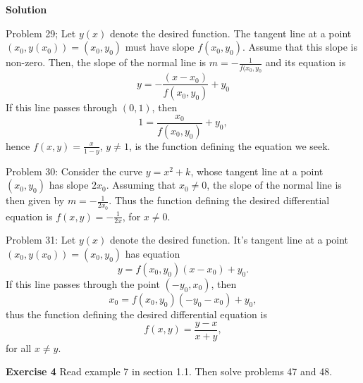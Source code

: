 \documentclass[12pt,oneside]{exam}
\newenvironment{exercise}[1]{\vspace{.1in}\noindent\textbf{Exercise #1 \hspace{.05em}}}{}
\newenvironment{newsolution}{\vspace{.1in}\noindent\textbf{Solution \hspace{.05em}}}{}
\begin{document}
\begin{newsolution}

Problem 29; Let $y(x)$ denote the desired function. The tangent line at a point $(x_0,y(x_0))=(x_0,y_0)$ must have slope $f(x_0,y_0)$. Assume that this slope is non-zero. Then, the slope of the normal line is $m=-\frac{1}{f(x_0,y_0}$ and its equation is 
\begin{equation*}
y=-\frac{(x-x_0)}{f(x_0,y_0)} + y_0
\end{equation*}
If this line passes through $(0,1)$, then 
\begin{equation*}
1=\frac{x_0}{f(x_0,y_0)} + y_0, 
\end{equation*}
hence $f(x,y)=\frac{x}{1-y}$, $y\neq 1$, is the function defining the equation we seek. 

Problem 30: Consider the curve $y=x^2+k$, whose tangent line at a point $(x_0,y_0)$ has slope $2x_0$. Assuming that $x_0 \neq 0$, the slope of the normal line is then given by $m=-\frac{1}{2x_0}$. Thus the function defining the desired differential equation is $f(x,y)=-\frac{1}{2x}$, for $x \neq 0$. 

Problem 31: Let $y(x)$ denote the desired function. It's tangent line at a point $(x_0,y(x_0))=(x_0,y_0)$ has equation
\begin{equation*}
y=f(x_0,y_0)(x-x_0) + y_0.
\end{equation*}
If this line passes through the point $(-y_0,x_0)$, then 
\begin{equation*}
x_0 = f(x_0,y_0)(-y_0-x_0)+y_0, 
\end{equation*}
thus the function defining the desired differential equation is 
\begin{equation*}
f(x,y)=\frac{y-x}{x+y},
\end{equation*}
for all $x \neq y$. 

\end{newsolution}

\begin{exercise}{4}
Read example 7 in section 1.1. Then solve problems 47 and 48. 
\end{exercise}
\end{document}
